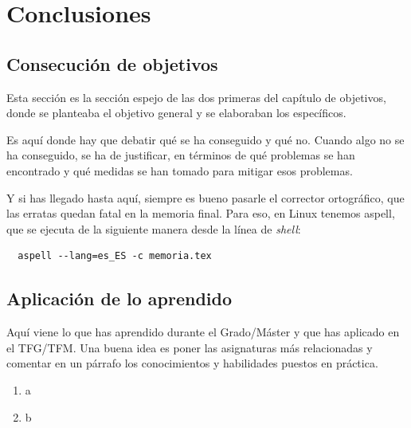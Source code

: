 \documentclass[a4paper, 12pt]{book}
\begin{document}




\cleardoublepage
\chapter{Conclusiones}
\label{chap:conclusiones}


\section{Consecución de objetivos}
\label{sec:consecucion-objetivos}

Esta sección es la sección espejo de las dos primeras del capítulo de objetivos, donde se planteaba el objetivo general y se elaboraban los específicos.

Es aquí donde hay que debatir qué se ha conseguido y qué no. 
Cuando algo no se ha conseguido, se ha de justificar, en términos de qué problemas se han encontrado y qué medidas se han tomado para mitigar esos problemas.

Y si has llegado hasta aquí, siempre es bueno pasarle el corrector ortográfico, que las erratas quedan fatal en la memoria final.
Para eso, en Linux tenemos aspell, que se ejecuta de la siguiente manera desde la línea de \emph{shell}:

\begin{verbatim}
  aspell --lang=es_ES -c memoria.tex
\end{verbatim}

\section{Aplicación de lo aprendido}
\label{sec:aplicacion}

Aquí viene lo que has aprendido durante el Grado/Máster y que has aplicado en el TFG/TFM. Una buena idea es poner las asignaturas más relacionadas y comentar en un párrafo los conocimientos y habilidades puestos en práctica.

\begin{enumerate}
  \item a
  \item b
\end{enumerate}
\end{document}
